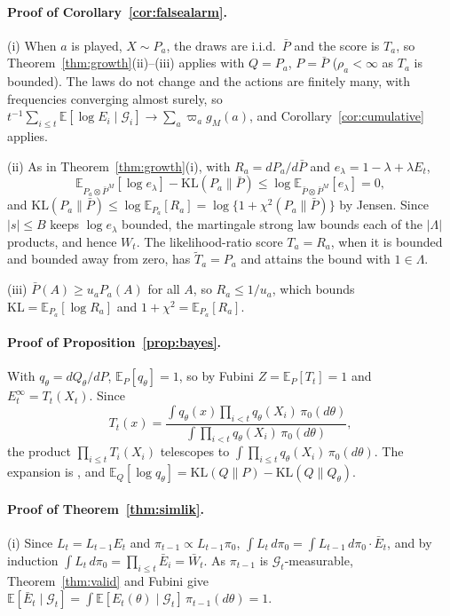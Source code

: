 \documentclass[11pt]{article}
\newcommand{\E}{\mathbb{E}}
\newcommand{\KL}{\mathrm{KL}}
\newcommand{\G}{\mathcal{G}}
\theoremstyle{remark}
\begin{document}
\paragraph{Proof of Corollary~\ref{cor:falsealarm}.}
(i) When $a$ is played, $X \sim P_a$, the draws are i.i.d.\ $\bar P$ and the
score is $T_a$, so Theorem~\ref{thm:growth}(ii)--(iii) applies with $Q = P_a$,
$P = \bar P$ ($\rho_a < \infty$ as $T_a$ is bounded). The laws do not change and
the actions are finitely many, with frequencies converging almost surely, so
$t^{-1}\sum_{i \le t}\E[\log E_i \mid \G_i] \to \sum_a \varpi_a g_M(a)$, and
Corollary~\ref{cor:cumulative} applies.

(ii) As in Theorem~\ref{thm:growth}(i), with $R_a = dP_a/d\bar P$ and
$e_\lambda = 1 - \lambda + \lambda E_t$,
\[
\E_{P_a \otimes \bar P^M}[\log e_\lambda] - \KL(P_a\|\bar P)
\le \log \E_{\bar P \otimes \bar P^M}[e_\lambda] = 0,
\]
and $\KL(P_a\|\bar P) \le \log\E_{P_a}[R_a] = \log\{1 + \chi^2(P_a\|\bar P)\}$ by
Jensen. Since $|s| \le B$ keeps $\log e_\lambda$ bounded, the martingale strong
law bounds each of the $|\Lambda|$ products, and hence $W_t$. The
likelihood-ratio score $T_a = R_a$, when it is bounded and bounded away from
zero, has $\tilde T_a = P_a$ and attains the bound with $1 \in \Lambda$.

(iii) $\bar P(A) \ge u_a P_a(A)$ for all $A$, so $R_a \le 1/u_a$, which bounds
$\KL = \E_{P_a}[\log R_a]$ and $1 + \chi^2 = \E_{P_a}[R_a]$.

\paragraph{Proof of Proposition~\ref{prop:bayes}.}
With $q_\theta = dQ_\theta/dP$, $\E_P[q_\theta] = 1$, so by Fubini
$Z = \E_P[T_t] = 1$ and $E_t^\infty = T_t(X_t)$. Since
\[
T_t(x) = \frac{\int q_\theta(x) \prod_{i<t} q_\theta(X_i)\,\pi_0(d\theta)}
{\int \prod_{i<t} q_\theta(X_i)\,\pi_0(d\theta)},
\]
the product $\prod_{i \le t} T_i(X_i)$ telescopes to
$\int \prod_{i \le t} q_\theta(X_i)\,\pi_0(d\theta)$. The expansion is
\citet{clarke1990information}, and $\E_Q[\log q_\theta] = \KL(Q\|P) - \KL(Q\|Q_\theta)$.

\paragraph{Proof of Theorem~\ref{thm:simlik}.}
(i) Since $L_t = L_{t-1}E_t$ and $\pi_{t-1} \propto L_{t-1}\pi_0$,
$\int L_t\, d\pi_0 = \int L_{t-1}\,d\pi_0 \cdot \bar E_t$, and by induction
$\int L_t\,d\pi_0 = \prod_{i \le t}\bar E_i = \bar W_t$. As $\pi_{t-1}$ is
$\G_t$-measurable, Theorem~\ref{thm:valid} and Fubini give
$\E[\bar E_t \mid \G_t] = \int \E[E_t(\theta) \mid \G_t]\,\pi_{t-1}(d\theta) = 1$.
\end{document}
